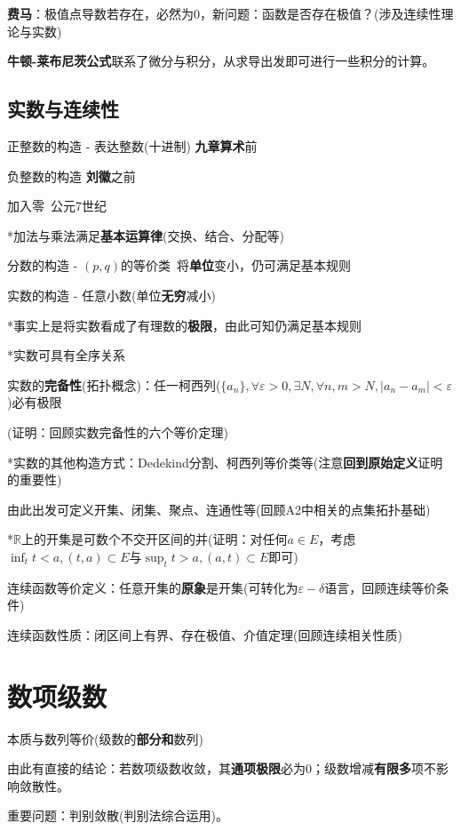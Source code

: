 \documentclass[a4paper,UTF8]{ctexart}
\begin{document}
\textbf{费马}：极值点导数若存在，必然为0，新问题：函数是否存在极值？(涉及连续性理论与实数)

\textbf{牛顿-莱布尼茨公式}联系了微分与积分，从求导出发即可进行一些积分的计算。

\subsection{实数与连续性}
正整数的构造 - 表达整数(十进制) \textbf{九章算术}前

负整数的构造 \textbf{刘徽}之前

加入零\ 公元7世纪

*加法与乘法满足\textbf{基本运算律}(交换、结合、分配等)

分数的构造 - $(p,q)$的等价类\ 将\textbf{单位}变小，仍可满足基本规则

实数的构造 - 任意小数(单位\textbf{无穷}减小)

*事实上是将实数看成了有理数的\textbf{极限}，由此可知仍满足基本规则

*实数可具有全序关系

实数的\textbf{完备性}(拓扑概念)：任一柯西列($\{a_n\},\forall\varepsilon>0,\exists N,\forall n,m>N,|a_n-a_m|<\varepsilon$)必有极限

(证明：回顾实数完备性的六个等价定理)

*实数的其他构造方式：Dedekind分割、柯西列等价类等(注意\textbf{回到原始定义}证明的重要性)

由此出发可定义开集、闭集、聚点、连通性等(回顾A2中相关的点集拓扑基础)

*$\mathbb{R}$上的开集是可数个不交开区间的并(证明：对任何$a\in E$，考虑$\inf_tt<a,(t,a)\subset E$与$\sup_tt>a,(a,t)\subset E$即可)

连续函数等价定义：任意开集的\textbf{原象}是开集(可转化为$\varepsilon-\delta$语言，回顾连续等价条件)

连续函数性质：闭区间上有界、存在极值、介值定理(回顾连续相关性质)

\section{数项级数}
本质与数列等价(级数的\textbf{部分和}数列)

由此有直接的结论：若数项级数收敛，其\textbf{通项极限}必为0；级数增减\textbf{有限多}项不影响敛散性。

重要问题：判别敛散(判别法综合运用)。
\end{document}
